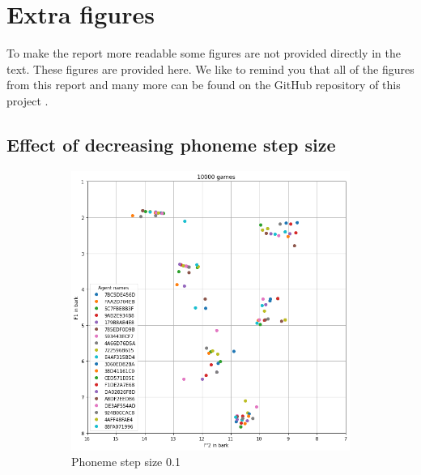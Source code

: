 \chapter*{Extra figures}
\label{ch:extra_figures}

To make the report more readable some figures are not provided directly in the text.
These figures are provided here.
We like to remind you that all of the figures from this report and many more can be found on the GitHub repository of this project \citep{github_project}.

\section*{Effect of decreasing phoneme step size}
\begin{figure}[ht]
    \centering
    \begin{subfigure}{.45\textwidth}
        \centering
        \includegraphics[width=\textwidth]{images/results/step_size_1.png}
        \captionsetup{width=0.9\linewidth}
        \captionsetup{justification=centering}
        \caption{Phoneme step size 0.1}
    \end{subfigure}
    \hspace{0.5cm}
    \begin{subfigure}{.45\textwidth}

\end{subfigure}
\end{figure}
